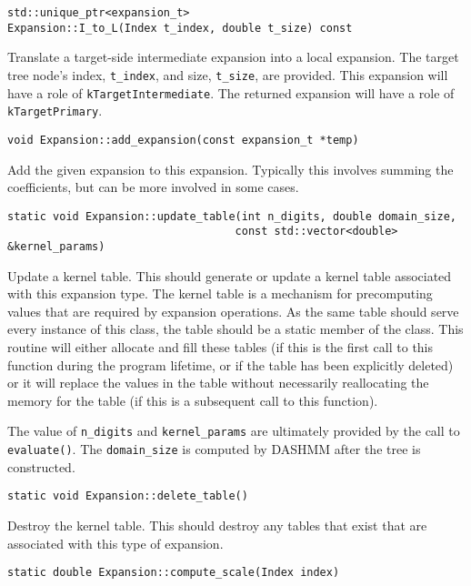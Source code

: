 \begin{lstlisting}
std::unique_ptr<expansion_t>
Expansion::I_to_L(Index t_index, double t_size) const
\end{lstlisting}

\noindent Translate a target-side intermediate expansion into a local
expansion. The target tree node's index, \texttt{t\_index}, and size,
\texttt{t\_size}, are provided.
This expansion will have a role of \texttt{kTargetIntermediate}.
The returned expansion will have a role of \texttt{kTargetPrimary}.

\begin{lstlisting}
void Expansion::add_expansion(const expansion_t *temp)
\end{lstlisting}

\noindent Add the given expansion to this expansion. Typically this involves
summing the coefficients, but can be more involved in some cases.

\begin{lstlisting}
static void Expansion::update_table(int n_digits, double domain_size,
                                   const std::vector<double> &kernel_params)
\end{lstlisting}

\noindent Update a kernel table. This should generate or update a kernel table
associated
with this expansion type. The kernel table is a mechanism for precomputing
values that are required by expansion operations. As the same table should
serve every instance of this class, the table should be a static member of the
class. This routine will either allocate and fill these tables (if this is the
first call to this function during the program lifetime, or if the table has
been explicitly deleted) or it will replace the values in the table without
necessarily reallocating the memory for the table (if this is a subsequent call
to this function).

The value of \texttt{n\_digits} and \texttt{kernel\_params} are ultimately
provided by the call to \texttt{evaluate()}. The
\texttt{domain\_size} is computed by DASHMM after the tree is constructed.

\begin{lstlisting}
static void Expansion::delete_table()
\end{lstlisting}

\noindent Destroy the kernel table. This should destroy any tables that exist
that are associated with this type of expansion.

\begin{lstlisting}
static double Expansion::compute_scale(Index index)
\end{lstlisting}

